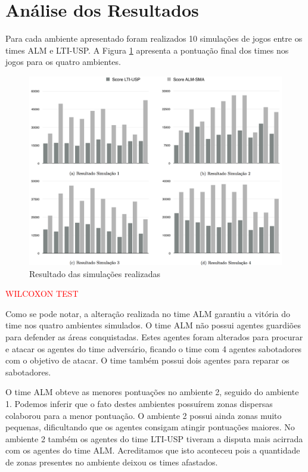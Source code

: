 \documentclass{llncs}
\begin{document}
\section{Análise dos Resultados}

Para cada ambiente apresentado foram realizados 10 simulações de jogos entre os times ALM e LTI-USP. A Figura \ref{fig:resultados} apresenta a pontuação final dos times nos jogos para os quatro ambientes.

\begin{figure}[!ht]
\centering
\includegraphics[width=1\linewidth]{./images/simulations-chart.png}
\caption{Resultado das simulações realizadas}
\label{fig:resultados}
\end{figure}

\textcolor{red}{WILCOXON TEST}

Como se pode notar, a alteração realizada no time ALM garantiu a vitória do time nos quatro ambientes simulados. O time ALM não possui agentes guardiões para defender as áreas conquistadas. Estes agentes foram alterados para procurar e atacar os agentes do time adversário, ficando o time com 4 agentes sabotadores com o objetivo de atacar. O time também possui dois agentes para reparar os sabotadores.

O time ALM obteve as menores pontuações no ambiente 2, seguido do ambiente 1. Podemos inferir que o fato destes ambientes possuírem zonas dispersas colaborou para a menor pontuação. O ambiente 2 possui ainda zonas muito pequenas, dificultando que os agentes consigam atingir pontuações maiores. No ambiente 2 também os agentes do time LTI-USP tiveram a disputa mais acirrada com os agentes do time ALM. Acreditamos que isto aconteceu pois a quantidade de zonas presentes no ambiente deixou os times afastados.
\end{document}
